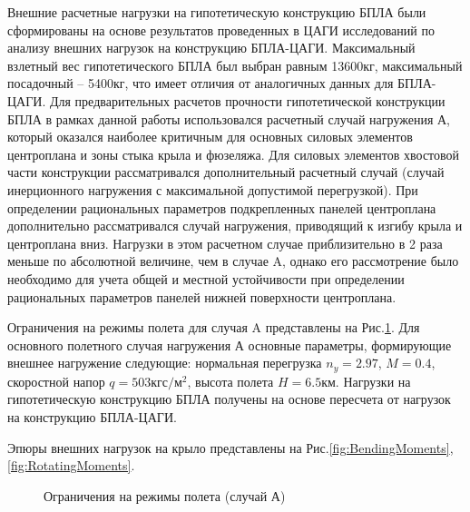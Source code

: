 Внешние расчетные нагрузки на гипотетическую конструкцию БПЛА были сформированы на основе результатов проведенных в ЦАГИ исследований \cite{BPS} по анализу внешних нагрузок на конструкцию БПЛА-ЦАГИ. Максимальный взлетный вес гипотетического БПЛА был выбран равным 13600кг, максимальный посадочный -- 5400кг, что имеет отличия от аналогичных данных для БПЛА-ЦАГИ. Для предварительных расчетов прочности гипотетической конструкции БПЛА в рамках данной работы использовался расчетный случай нагружения А, который оказался наиболее критичным для основных силовых элементов центроплана и зоны стыка крыла и фюзеляжа. Для силовых элементов хвостовой части конструкции рассматривался дополнительный расчетный случай (случай инерционного нагружения с максимальной допустимой перегрузкой). При определении рациональных параметров подкрепленных панелей центроплана дополнительно рассматривался случай нагружения, приводящий к изгибу крыла и центроплана вниз. Нагрузки в этом расчетном случае приблизительно в 2 раза меньше по абсолютной величине, чем в случае A, однако его рассмотрение было необходимо для учета общей и местной устойчивости при определении рациональных параметров панелей нижней поверхности центроплана.



Ограничения на режимы полета для случая A представлены на Рис.\ref{fig:ModeOfFlight}. Для основного полетного случая нагружения А основные параметры, формирующие внешнее нагружение следующие: нормальная перегрузка $n_y = 2.97$, $M = 0.4$, скоростной напор $q = 503 \text{кгс}/\text{м}^2$, высота полета $H = 6.5\text{км}$. Нагрузки на гипотетическую конструкцию БПЛА получены на основе пересчета от нагрузок на конструкцию БПЛА-ЦАГИ.


Эпюры внешних нагрузок на крыло представлены на Рис.\ref{fig:BendingMoments},\ref{fig:RotatingMoments}.





\begin{figure}[H]
\centering
\def\svgwidth{0.9\textwidth}

\caption{Ограничения на режимы полета (случай А)}
\label{fig:ModeOfFlight}
\end{figure}


